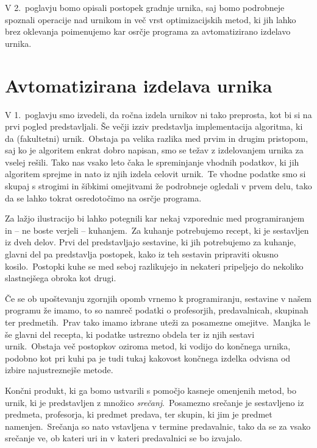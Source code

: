 \documentclass[a4paper,10pt]{article}
\begin{document}
V 2.\ poglavju bomo opisali postopek gradnje urnika, saj bomo podrobneje spoznali
operacije nad urnikom in več vrst optimizacijskih metod, ki jih lahko brez oklevanja
poimenujemo kar osrčje programa za avtomatizirano izdelavo urnika.

\section{Avtomatizirana izdelava urnika}

V 1.\ poglavju smo izvedeli, da ročna izdela urnikov ni tako preprosta, kot bi si
na prvi pogled predstavljali. Še večji izziv predstavlja implementacija algoritma, ki da
(fakultetni) urnik.\ Obstaja pa velika razlika med prvim in drugim pristopom, saj ko je
algoritem enkrat dobro napisan, smo se težav z izdelovanjem urnika za vselej rešili.
Tako nas vsako leto čaka le spreminjanje vhodnih podatkov, ki jih algoritem sprejme in
nato iz njih izdela celovit urnik.\ Te vhodne podatke smo si skupaj s strogimi in šibkimi
omejitvami že podrobneje ogledali v prvem delu, tako da se lahko tokrat osredotočimo na
osrčje programa.

Za lažjo ilustracijo bi lahko potegnili kar nekaj vzporednic med programiranjem in -- ne
boste verjeli -- kuhanjem.\ Za kuhanje potrebujemo recept, ki je sestavljen iz dveh delov.
Prvi del predstavljajo sestavine, ki jih potrebujemo za kuhanje, glavni del pa predstavlja
postopek, kako iz teh sestavin pripraviti okusno kosilo.\ Postopki kuhe se med seboj
razlikujejo in nekateri pripeljejo do nekoliko slastnejšega obroka kot drugi.

Če se ob upoštevanju zgornjih opomb vrnemo k programiranju, sestavine v našem programu že
imamo, to so namreč podatki o profesorjih, predavalnicah, skupinah ter predmetih.\ Prav tako
imamo izbrane uteži za posamezne omejitve.\ Manjka le še glavni del recepta, ki podatke
ustrezno obdela ter iz njih sestavi urnik.\ Obstaja več postopkov oziroma metod, ki vodijo
do končnega urnika, podobno kot pri kuhi pa je tudi tukaj kakovost končnega izdelka odvisna
od izbire najustreznejše metode.

Končni produkt, ki ga bomo ustvarili s pomočjo kasneje omenjenih metod, bo urnik, ki je
predstavljen z množico \emph{srečanj}.\ Posamezno srečanje je sestavljeno iz predmeta,
profesorja, ki predmet predava, ter skupin, ki jim je predmet namenjen.\ Srečanja so nato
vstavljena v termine predavalnic, tako da se za vsako srečanje ve, ob kateri uri in v
kateri predavalnici se bo izvajalo.
\end{document}
